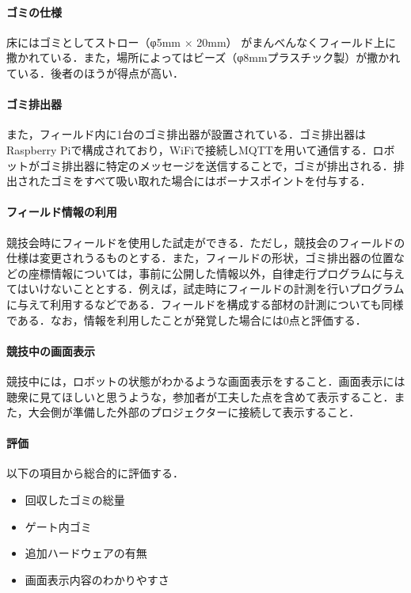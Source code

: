 \documentclass[submit]{ipsj}
\begin{document}
\paragraph*{ゴミの仕様}
床にはゴミとしてストロー（φ5mm $\times$ 20mm） がまんべんなくフィールド上に撒かれている．また，場所によってはビーズ（φ8mmプラスチック製）が撒かれている．後者のほうが得点が高い．

\paragraph*{ゴミ排出器}
また，フィールド内に1台のゴミ排出器が設置されている．ゴミ排出器はRaspberry Piで構成されており，WiFiで接続しMQTTを用いて通信する．ロボットがゴミ排出器に特定のメッセージを送信することで，ゴミが排出される．排出されたゴミをすべて吸い取れた場合にはボーナスポイントを付与する．

\paragraph*{フィールド情報の利用}
競技会時にフィールドを使用した試走ができる．ただし，競技会のフィールドの仕様は変更されうるものとする．また，フィールドの形状，ゴミ排出器の位置などの座標情報については，事前に公開した情報以外，自律走行プログラムに与えてはいけないこととする．例えば，試走時にフィールドの計測を行いプログラムに与えて利用するなどである．フィールドを構成する部材の計測についても同様である．なお，情報を利用したことが発覚した場合には0点と評価する．

\paragraph*{競技中の画面表示}
競技中には，ロボットの状態がわかるような画面表示をすること．画面表示には聴衆に見てほしいと思うような，参加者が工夫した点を含めて表示すること．また，大会側が準備した外部のプロジェクターに接続して表示すること．

\paragraph*{評価}
以下の項目から総合的に評価する．
\begin{itemize}
\item 回収したゴミの総量
\item ゲート内ゴミ
\item 追加ハードウェアの有無
\item 画面表示内容のわかりやすさ
\end{itemize}
\end{document}

